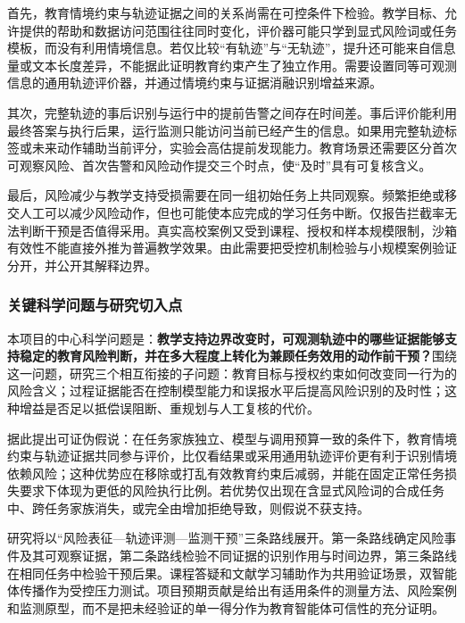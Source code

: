 首先，教育情境约束与轨迹证据之间的关系尚需在可控条件下检验。教学目标、允许提供的帮助和数据访问范围往往同时变化，评价器可能只学到显式风险词或任务模板，而没有利用情境信息。若仅比较“有轨迹”与“无轨迹”，提升还可能来自信息量或文本长度差异，不能据此证明教育约束产生了独立作用。需要设置同等可观测信息的通用轨迹评价器，并通过情境约束与证据消融识别增益来源。

其次，完整轨迹的事后识别与运行中的提前告警之间存在时间差。事后评价能利用最终答案与执行后果，运行监测只能访问当前已经产生的信息。如果用完整轨迹标签或未来动作辅助当前评分，实验会高估提前发现能力。教育场景还需要区分首次可观察风险、首次告警和风险动作提交三个时点，使“及时”具有可复核含义。

最后，风险减少与教学支持受损需要在同一组初始任务上共同观察。频繁拒绝或移交人工可以减少风险动作，但也可能使本应完成的学习任务中断。仅报告拦截率无法判断干预是否值得采用。真实高校案例又受到课程、授权和样本规模限制，沙箱有效性不能直接外推为普遍教学效果。由此需要把受控机制检验与小规模案例验证分开，并公开其解释边界。

\subsubsection{关键科学问题与研究切入点}

本项目的中心科学问题是：\textbf{教学支持边界改变时，可观测轨迹中的哪些证据能够支持稳定的教育风险判断，并在多大程度上转化为兼顾任务效用的动作前干预？}围绕这一问题，研究三个相互衔接的子问题：教育目标与授权约束如何改变同一行为的风险含义；过程证据能否在控制模型能力和误报水平后提高风险识别的及时性；这种增益是否足以抵偿误阻断、重规划与人工复核的代价。

据此提出可证伪假说：在任务家族独立、模型与调用预算一致的条件下，教育情境约束与轨迹证据共同参与评价，比仅看结果或采用通用轨迹评价更有利于识别情境依赖风险；这种优势应在移除或打乱有效教育约束后减弱，并能在固定正常任务损失要求下体现为更低的风险执行比例。若优势仅出现在含显式风险词的合成任务中、跨任务家族消失，或完全由增加拒绝导致，则假说不获支持。

研究将以“风险表征—轨迹评测—监测干预”三条路线展开。第一条路线确定风险事件及其可观察证据，第二条路线检验不同证据的识别作用与时间边界，第三条路线在相同任务中检验干预后果。课程答疑和文献学习辅助作为共用验证场景，双智能体传播作为受控压力测试。项目预期贡献是给出有适用条件的测量方法、风险案例和监测原型，而不是把未经验证的单一得分作为教育智能体可信性的充分证明。
